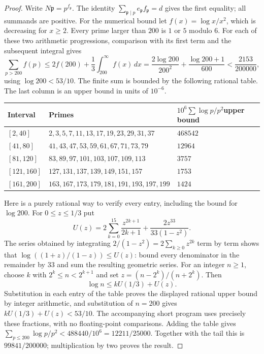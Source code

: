 \begin{proof}
Write $N\mathfrak p=p^{f_{\mathfrak p}}$. The identity
$\sum_{\mathfrak p\mid p}e_{\mathfrak p}f_{\mathfrak p}=d$ gives the
first equality; all summands are positive.
For the numerical bound let $f(x)=\log x/x^2$, which is decreasing for
$x\ge2$. Every prime larger than $200$ is $1$ or $5$ modulo $6$.
For each of these two arithmetic progressions, comparison with its
first term and the subsequent integral gives
\[
 \sum_{p>200}f(p)
 \le2f(200)+\frac13\int_{200}^{\infty}f(x)\,dx
 =\frac{2\log200}{200^2}+\frac{\log200+1}{600}
 <\frac{2153}{200000},
\]
using $\log200<53/10$.
The finite sum is bounded by the following rational table. The last
column is an upper bound in units of $10^{-6}$.
\begin{center}\small
\begin{tabular}{lll}
\toprule
Interval&Primes&$10^6\sum\log p/p^2$\quad upper bound\\
\midrule
$[2,40]$&$2,3,5,7,11,13,17,19,23,29,31,37$&$468542$\\
$[41,80]$&$41,43,47,53,59,61,67,71,73,79$&$12964$\\
$[81,120]$&$83,89,97,101,103,107,109,113$&$3757$\\
$[121,160]$&$127,131,137,139,149,151,157$&$1753$\\
$[161,200]$&$163,167,173,179,181,191,193,197,199$&$1424$\\
\bottomrule
\end{tabular}
\end{center}
Here is a purely rational way to verify every entry, including the
bound for $\log200$. For $0\le z\le1/3$ put
\[
 U(z)=2\sum_{k=0}^{15}\frac{z^{2k+1}}{2k+1}
                   +\frac{2z^{33}}{33(1-z^2)}.
\]
The series obtained by integrating
$2/(1-z^2)=2\sum_{k\ge0}z^{2k}$ term by term shows that
$\log((1+z)/(1-z))\le U(z)$: bound every denominator in the remainder
by $33$ and sum the resulting geometric series.
For an integer $n\ge1$, choose $k$ with $2^k\le n<2^{k+1}$ and set
$z=(n-2^k)/(n+2^k)$. Then
\[
 \log n\le kU(1/3)+U(z).
\]
Substitution in each entry of the table proves the displayed rational
upper bound by integer arithmetic, and substitution of $n=200$ gives
$kU(1/3)+U(z)<53/10$. The accompanying short program uses precisely
these fractions, with no floating-point comparisons.
Adding the table gives
$\sum_{p\le200}\log p/p^2<488440/10^6=12211/25000$.
Together with the tail this is $99841/200000$; multiplication by two
proves the result.
\end{proof}

